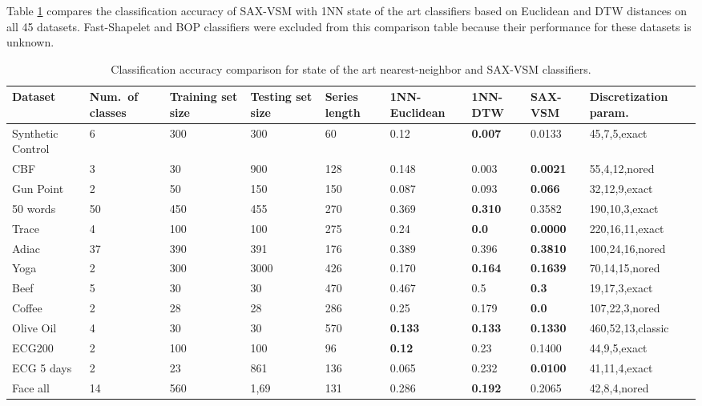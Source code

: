 Table \ref{perf_table2} compares the classification accuracy of SAX-VSM with 
1NN state of the art classifiers based on Euclidean and DTW distances on all 45 datasets. 
Fast-Shapelet and BOP classifiers were excluded from this comparison table because their 
performance for these datasets is unknown.

\clearpage

\begin{table}[t!]
\caption{Classification accuracy comparison for state of the art nearest-neighbor and SAX-VSM classifiers.}
 \label{perf_table2}
\centering
{\setlength{\extrarowheight}{1pt}%
{\scriptsize
\begin{tabularx}{\linewidth}{@{} l *7X @{} l}
\hline
Dataset & \mbox{Num. of} classes & Training set size & Testing set size & Series length & 1NN-Euclidean & 1NN-DTW & SAX-VSM & Discretization param. \\
\hline
Synthetic Control & 6 & 300 & 300 & 60 & 0.12 & \textbf{0.007} & 0.0133 & 45,7,5,exact \\
CBF & 3 & 30 & 900 & 128 & 0.148 & 0.003 & \textbf{0.0021} & 55,4,12,nored \\
Gun Point & 2 & 50 & 150 & 150 & 0.087 & 0.093 & \textbf{0.066} & 32,12,9,exact \\
50 words & 50 & 450 & 455 & 270 & 0.369 & \textbf{0.310} & 0.3582 & 190,10,3,exact \\ 
Trace & 4 & 100 & 100 & 275 & 0.24 & \textbf{0.0} & \textbf{0.0000} & 220,16,11,exact \\
Adiac & 37 & 390 & 391 & 176 & 0.389 & 0.396 & \textbf{0.3810} & 100,24,16,nored \\
Yoga & 2 & 300 & 3000 & 426 & 0.170 & \textbf{0.164} & \textbf{0.1639} & 70,14,15,nored \\ 
Beef & 5 & 30 & 30 & 470 & 0.467 & 0.5 & \textbf{0.3} & 19,17,3,exact \\ 
Coffee & 2 & 28 & 28 & 286 & 0.25 & 0.179 & \textbf{0.0} & 107,22,3,nored \\
Olive Oil & 4 & 30 & 30 & 570 & \textbf{0.133} & \textbf{0.133} & \textbf{0.1330} & 460,52,13,classic \\
ECG200 & 2 & 100 & 100 & 96 & \textbf{0.12} & 0.23 & 0.1400 & 44,9,5,exact \\
ECG 5 days & 2 & 23 & 861 & 136 & 0.065 & 0.232 & \textbf{0.0100} & 41,11,4,exact \\
Face all & 14 & 560 & 1,69 & 131 & 0.286 & \textbf{0.192} & 0.2065 & 42,8,4,nored \\

\end{tabularx}}}
\end{table}
